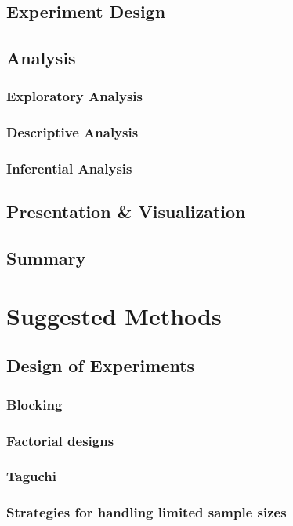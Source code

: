 \documentclass[11pt,a4paper,article]{memoir} %
\begin{document}
\section{Experiment Design}

\section{Analysis}
\subsection{Exploratory Analysis}
\subsection{Descriptive Analysis}
\subsection{Inferential Analysis}

\section{Presentation \& Visualization}

\section{Summary}

\newpage


\chapter{Suggested Methods}
\section{Design of Experiments}
\subsection{Blocking}
\subsection{Factorial designs}
\subsection{Taguchi}
\subsection{Strategies for handling limited sample sizes}
\end{document}
